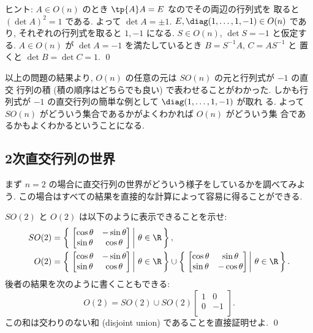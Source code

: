 \documentclass[12pt,twoside]{jarticle}
\begin{document}
\noindent
ヒント: $A\in O(n)$ のとき $\tp{A}A=E$ なのでその両辺の行列式を
取ると $(\det A)^2 = 1$ である. よって $\det A = \pm 1$.
$E, \diag(1,\dots,1,-1)\in O(n)$ であり, 
それぞれの行列式を取ると $1, -1$ になる.
$S\in O(n)$, $\det S = -1$ と仮定する.
$A\in O(n)$ が $\det A = -1$ を満たしているとき $B=S^{-1}A$, $C=AS^{-1}$ と
置くと $\det B = \det C = 1$.
\qed

\medskip

以上の問題の結果より, $O(n)$ の任意の元は $SO(n)$ の元と行列式が $-1$ の直交
行列の積 (積の順序はどちらでも良い) で表わせることがわかった.  
しかも行列式が $-1$ の直交行列の簡単な例として $\diag(1,\dots,1,-1)$ が取れ
る.  よって $SO(n)$ がどういう集合であるかがよくわかれば $O(n)$ がどういう集
合であるかもよくわかるということになる.  


\subsection{2次直交行列の世界}
\label{sec:O(2)}

まず $n=2$ の場合に直交行列の世界がどういう様子をしているかを調べてみよう.
この場合はすべての結果を直接的な計算によって容易に得ることができる.

\begin{question}
  $SO(2)$ と $O(2)$ は以下のように表示できることを示せ:
  \begin{align*}
    SO(2) &= 
    \left\{\,\left.
      \begin{bmatrix}
        \cos\theta & -\sin\theta \\
        \sin\theta &  \cos\theta \\
      \end{bmatrix}
    \,\right|\, \theta\in\R \,\right\},
    \\
    O(2) &= 
    \left\{\,\left.
      \begin{bmatrix}
        \cos\theta & -\sin\theta \\
        \sin\theta &  \cos\theta \\
      \end{bmatrix}
    \,\right|\, \theta\in\R \,\right\}
    \cup
    \left\{\,\left.
      \begin{bmatrix}
        \cos\theta &  \sin\theta \\
        \sin\theta & -\cos\theta \\
      \end{bmatrix}
    \,\right|\, \theta\in\R \,\right\}.
  \end{align*}
  後者の結果を次のように書くこともできる:
  \begin{equation*}
    O(2) = SO(2) \cup SO(2)
    \begin{bmatrix}
      1 &  0 \\
      0 & -1 \\
    \end{bmatrix}.
  \end{equation*}
  この和は交わりのない和 (disjoint union) であることを直接証明せよ. \qed
\end{question}
\end{document}

